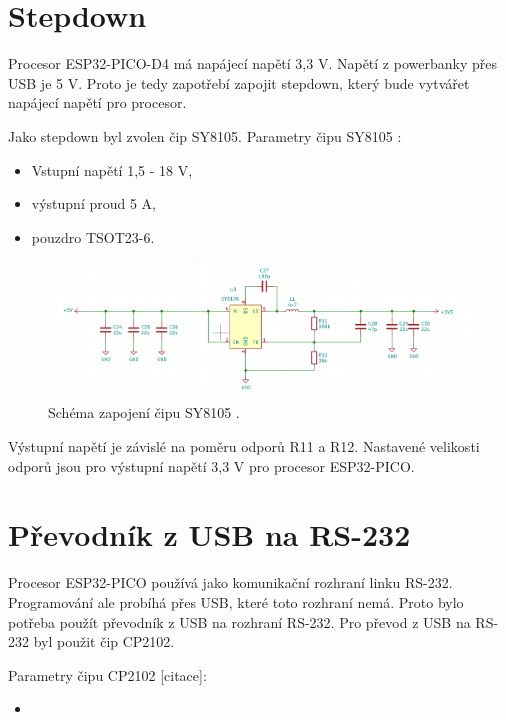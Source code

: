   \section{Stepdown}
  Procesor ESP32-PICO-D4 má napájecí napětí 3,3 V. Napětí z powerbanky přes USB je 5 V. Proto je tedy zapotřebí zapojit 
  stepdown, který bude vytvářet napájecí napětí pro procesor.

  Jako stepdown byl zvolen čip SY8105.
  Parametry čipu SY8105 \cite{SY8105_datasheet}:
  \begin{itemize}
    \item Vstupní napětí 1,5 - 18 V,
    \item výstupní proud 5 A,
    \item pouzdro TSOT23-6.
  \end{itemize}

  \begin{figure}[!h]
    \begin{center}
      \includegraphics[scale=0.5]{obrazky/SY8105_schema.png}
    \end{center}
    \caption[SY8105 schéma]{Schéma zapojení čipu SY8105 \cite{SY8105_datasheet}.}
  \end{figure}

  Výstupní napětí je závislé na poměru odporů R11 a R12. Nastavené velikosti odporů jsou pro výstupní napětí 3,3 V pro procesor 
  ESP32-PICO.

  \section{Převodník z USB na RS-232}
  Procesor ESP32-PICO používá jako komunikační rozhraní linku RS-232. Programování ale probíhá přes USB, které toto rozhraní
  nemá. Proto bylo potřeba použít převodník z USB na rozhraní RS-232.
Pro převod z USB na RS-232 byl použit čip CP2102. %

Parametry čipu CP2102 [citace]:
\begin{itemize}
    \item 
\end{itemize}


